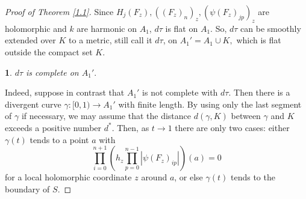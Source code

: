 \documentclass[12pt,article]{amsart}
\newtheorem{claim}[equation]{\indent{\it Claim}\rm }
\numberwithin{equation}{section}
\begin{document}
\begin{proof}[Proof of Theorem \ref{1.1}]

Since $H_j(F_z),((F_z)_{n})_z,(\psi(F_z)_{jp})_z$ are holomorphic and $k$ are harmonic on $A_1$, $d\tau$ is flat on $A_1$. So, $d\tau$ can be smoothly extended over $K$ to a metric, still call it $d\tau$, on $A_1' =A_1\cup K,$ which is flat outside the compact set $K$.

\begin{claim}\label{cl4.2}
$d\tau$ is complete on $A_1'.$
\end{claim}
Indeed, suppose in contrast that $A_1'$ is not complete with $d\tau$. Then there is a divergent curve $\gamma: [0,1)\rightarrow A_1'$ with finite length. By using only the last segment of $\gamma$ if necessary, we may assume that the distance $d(\gamma,K)$ between $\gamma$ and $K$ exceeds a positive number $d^*$. Then, as $t\rightarrow 1$ there are only two cases: either $\gamma(t)$ tends to a point $a$ with
$$ \prod_{i=0}^{n+1}(h_z\prod_{p=0}^{n-1}|\psi(F_z)_{ip}|)(a)=0$$
for a local holomorphic coordinate $z$ around $a$, or else $\gamma (t)$ tends to the boundary of $S$.


\end{proof}
\end{document}
